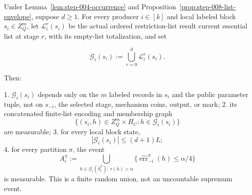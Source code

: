 \begin{lemma}\label{lem:step-013-block-family}
Under Lemma~\ref{lem:step-004-occurrence} and Proposition~\ref{prop:step-008-list-envelope}, suppose \(d\geq1\). For every
producer \(i\in[k]\) and local labeled block \(s_i\in Z_Q^m\), let
\(\mathcal L_i^r(s_i)\) be the actual ordered restriction-list result current essential
list at stage \(r\), with its  empty-list totalization, and set

\[
 \mathcal G_i(s_i)
 :=\bigcup_{r=0}^d\mathcal L_i^r(s_i).
 \tag{16}
\]

Then:

1. \(\mathcal G_i(s_i)\) depends only on the \(m\) labeled records in
   \(s_i\) and the public parameter tuple, not on \(s_{-i}\), the selected
   stage, mechanism coins, output, or mark;
2. its concatenated finite-list encoding and membership graph
   \[
     \{(s_i,h)\in Z_Q^m\times H_C:h\in\mathcal G_i(s_i)\}
     \tag{17}
   \]
   are measurable;
3. for every local block state,
   \[
     |\mathcal G_i(s_i)|\leq(d+1)L;
     \tag{18}
   \]
4. for every partition \(\pi\), the event
   \[
    A_i^\pi:=
    \bigcup_{h\in\mathcal G_i(\bar S_i^\pi):\ r(h)>\alpha}
      \{\widehat{\operatorname{err}}_{-i}^\pi(h)\leq\alpha/4\}
    \tag{19}
   \]
   is measurable. This is a finite random union, not an uncountable
   supremum event.


\end{lemma}

